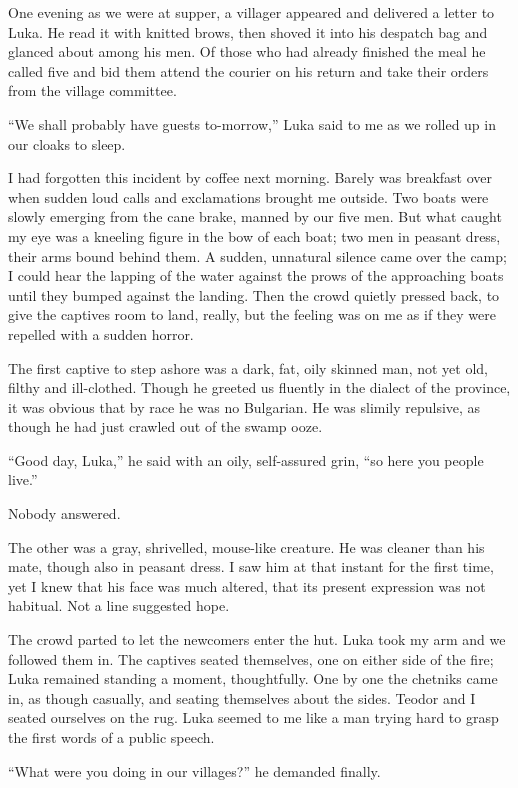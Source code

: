 \documentclass[a5paper,12pt]{book}
\begin{document}
One evening as we were at supper, a villager appeared and delivered a letter to Luka. He read it with knitted brows, then shoved it into his despatch bag and glanced about among his men. Of those who had already finished the meal he called five and bid them attend the courier on his return and take their orders from the village committee. 

“We shall probably have guests to-morrow,” Luka said to me as we rolled up in our cloaks to sleep. 

I had forgotten this incident by coffee next morning. Barely was breakfast over when sudden loud calls and exclamations brought me outside. Two boats were slowly emerging from the cane brake, manned by our five men. But what caught my eye was a kneeling figure in the bow of each boat; two men in peasant dress, their arms bound behind them. A sudden, unnatural silence came over the camp; I could hear the lapping of the water against the prows of the approaching boats until they bumped against the landing. Then the crowd quietly pressed back, to give the captives room to land, really, but the feeling was on me as if they were repelled with a sudden horror. 

The first captive to step ashore was a dark, fat, oily skinned man, not yet old, filthy and ill-clothed. Though he greeted us fluently in the dialect of the province, it was obvious that by race he was no Bulgarian. He was slimily repulsive, as though he had just crawled out of the swamp ooze. 

“Good day, Luka,” he said with an oily, self-assured grin, “so here you people live.” 

Nobody answered. 

The other was a gray, shrivelled, mouse-like creature. He was cleaner than his mate, though also in peasant dress. I saw him at that instant for the first time, yet I knew that his face was much altered, that its present expression was not habitual. Not a line suggested hope. 

The crowd parted to let the newcomers enter the hut. Luka took my arm and we followed them in. The captives seated themselves, one on either side of the fire; Luka remained standing a moment, thoughtfully. One by one the chetniks came in, as though casually, and seating themselves about the sides. Teodor and I seated ourselves on the rug. Luka seemed to me like a man trying hard to grasp the first words of a public speech. 

“What were you doing in our villages?” he demanded finally. 
\end{document}
